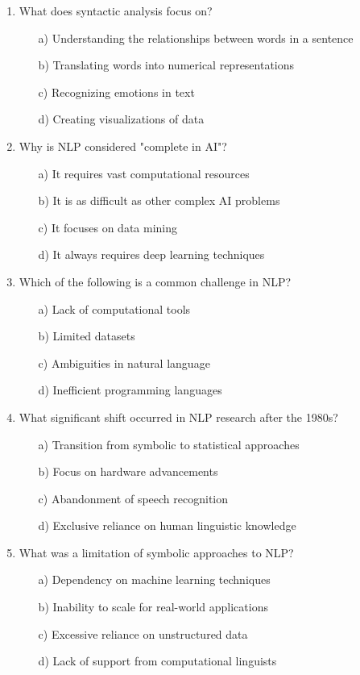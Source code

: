 \documentclass[8pt]{extarticle}
\begin{document}
\begin{multicols}{2}
\begin{enumerate}
\item What does syntactic analysis focus on?
\begin{itemize}
    \item[a)] Understanding the relationships between words in a sentence
    \item[b)] Translating words into numerical representations
    \item[c)] Recognizing emotions in text
    \item[d)] Creating visualizations of data
\end{itemize}

\item Why is NLP considered "complete in AI"?
\begin{itemize}
    \item[a)] It requires vast computational resources
    \item[b)] It is as difficult as other complex AI problems
    \item[c)] It focuses on data mining
    \item[d)] It always requires deep learning techniques
\end{itemize}

\item Which of the following is a common challenge in NLP?
\begin{itemize}
    \item[a)] Lack of computational tools
    \item[b)] Limited datasets
    \item[c)] Ambiguities in natural language
    \item[d)] Inefficient programming languages
\end{itemize}

\item What significant shift occurred in NLP research after the 1980s?
\begin{itemize}
    \item[a)] Transition from symbolic to statistical approaches
    \item[b)] Focus on hardware advancements
    \item[c)] Abandonment of speech recognition
    \item[d)] Exclusive reliance on human linguistic knowledge
\end{itemize}

\item What was a limitation of symbolic approaches to NLP?
\begin{itemize}
    \item[a)] Dependency on machine learning techniques
    \item[b)] Inability to scale for real-world applications
    \item[c)] Excessive reliance on unstructured data
    \item[d)] Lack of support from computational linguists
\end{itemize}


\end{enumerate}
\end{multicols}
\end{document}

